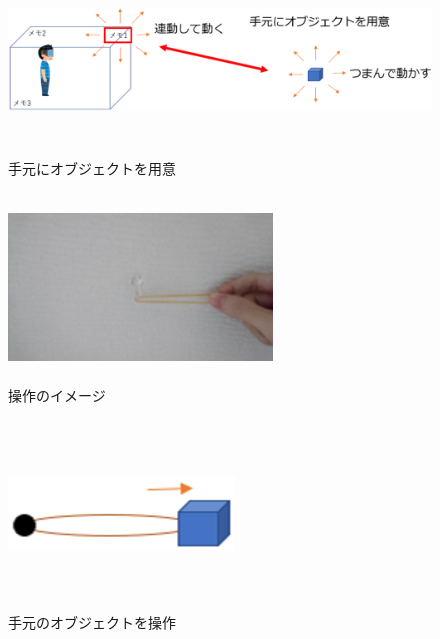 \documentclass[11pt,a4j, titlepage]{jarticle} %
\begin{document}
\begin{figure}[H]
  \begin{center}
    \includegraphics[clip,height=5.0cm,width=16.0cm]{./3d_rubber_band2.eps}
    \caption{手元にオブジェクトを用意}
    \label{fig:3d_rubber_band2}
  \end{center}
\end{figure}

\begin{figure}[H]
  \begin{center}
    \includegraphics[clip,height=5.0cm,width=7.0cm]{./3d_rubber_band3.eps}
    \caption{操作のイメージ}
    \label{fig:3d_rubber_band3}
  \end{center}
\end{figure}

\begin{figure}[H]
  \begin{center}
    \includegraphics[clip,height=5.0cm,width=6.0cm]{./3d_rubber_band4.eps}
    \caption{手元のオブジェクトを操作}
    \label{fig:3d_rubber_band4}
  \end{center}
\end{figure}
\end{document}
